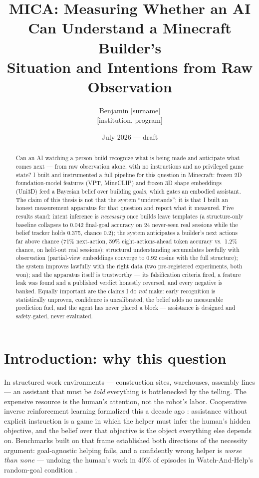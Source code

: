 \documentclass[11pt]{article}
\title{MICA: Measuring Whether an AI Can Understand a Minecraft Builder's\\
Situation and Intentions from Raw Observation}
\author{Benjamin [surname] \\ \small [institution, program]}
\date{July 2026 --- draft}
\begin{document}
\maketitle

\begin{abstract}
Can an AI watching a person build recognize what is being made and anticipate
what comes next --- from raw observation alone, with no instructions and no
privileged game state? I built and instrumented a full pipeline for this
question in Minecraft: frozen 2D foundation-model features (VPT, MineCLIP) and
frozen 3D shape embeddings (Uni3D) feed a Bayesian belief over building goals,
which gates an embodied assistant. The claim of this thesis is not that the
system ``understands''; it is that I built an honest measurement apparatus for
that question and report what it measured. Five results stand: intent inference
is \emph{necessary} once builds leave templates (a structure-only baseline
collapses to 0.042 final-goal accuracy on 24 never-seen real sessions while the
belief tracker holds 0.375, chance 0.2); the system anticipates a builder's
next actions far above chance (71\% next-action, 59\% eight-actions-ahead
token accuracy vs.\ 1.2\% chance, on held-out real sessions); structural
understanding accumulates lawfully with observation (partial-view embeddings
converge to 0.92 cosine with the full structure); the system improves lawfully
with the right data (two pre-registered experiments, both won); and the
apparatus itself is trustworthy --- its falsification criteria fired, a feature
leak was found and a published verdict honestly reversed, and every negative is
banked. Equally important are the claims I do \emph{not} make: early
recognition is statistically unproven, confidence is uncalibrated, the belief
adds no measurable prediction fuel, and the agent has never placed a block ---
assistance is designed and safety-gated, never evaluated.
\end{abstract}

\section{Introduction: why this question}

In structured work environments --- construction sites, warehouses, assembly
lines --- an assistant that must be \emph{told} everything is bottlenecked by
the telling. The expensive resource is the human's attention, not the robot's
labor. Cooperative inverse reinforcement learning formalized this a decade ago
\cite{cirl}: assistance without explicit instruction is a game in which the
helper must infer the human's hidden objective, and the belief over that
objective is the object everything else depends on. Benchmarks built on that
frame established both directions of the necessity argument: goal-agnostic
helping fails, and a confidently wrong helper is \emph{worse than none} ---
undoing the human's work in 40\% of episodes in Watch-And-Help's random-goal
condition \cite{wah,nopa}.
\end{document}
